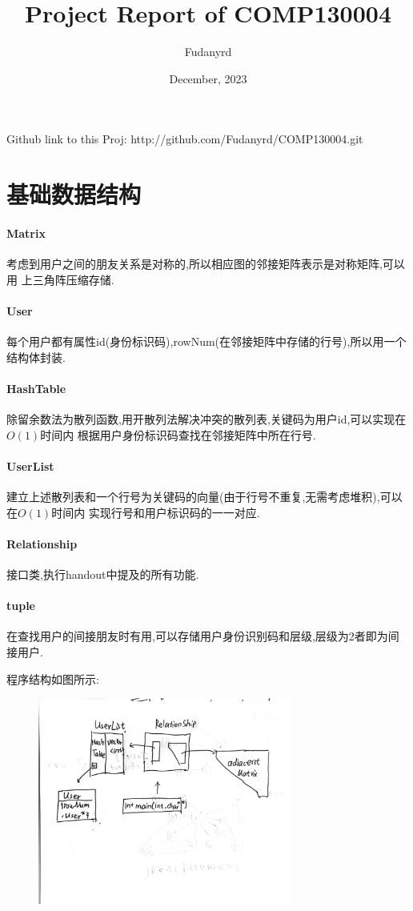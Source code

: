 \documentclass{article}
\title{Project Report of COMP130004}
\author{Fudanyrd}
\date{December, 2023}
\begin{document}
\begin{CJK*}{UTF8}{gbsn}
\maketitle
\par Github link to this Proj: http://github.com/Fudanyrd/COMP130004.git

\section{基础数据结构}

\paragraph{Matrix}
 考虑到用户之间的朋友关系是对称的,所以相应图的邻接矩阵表示是对称矩阵,可以用
上三角阵压缩存储.
\paragraph{User}
 每个用户都有属性id(身份标识码),rowNum(在邻接矩阵中存储的行号),所以用一个结构体封装.
\paragraph{HashTable}
除留余数法为散列函数,用开散列法解决冲突的散列表,关键码为用户id,可以实现在$O(1)$时间内
根据用户身份标识码查找在邻接矩阵中所在行号.
\paragraph{UserList}
建立上述散列表和一个行号为关键码的向量(由于行号不重复,无需考虑堆积),可以在$O(1)$时间内
实现行号和用户标识码的一一对应.
\paragraph{Relationship}
接口类,执行handout中提及的所有功能.
\paragraph{tuple}
在查找用户的间接朋友时有用,可以存储用户身份识别码和层级,层级为2者即为间接用户.
\par 程序结构如图所示:
\begin{figure}[H]
    \centering
    \includegraphics[width=0.75\textwidth]{explanation.jpg}
\end{figure}


\end{CJK*}
\end{document}
